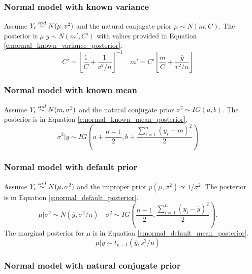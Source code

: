\subsubsection{Normal model with known variance}

Assume $Y_i\stackrel{ind}{\sim} N(\mu,v^2)$ and the natural conjugate prior $\mu\sim N(m,C)$. 
The posterior is $\mu|y \sim N(m',C')$ with values provided
in Equation \eqref{e:normal_known_variance_posterior}.
\begin{equation}
C' = \left[\frac{1}{C} + \frac{1}{v^2/n}\right]^{-1} \quad 
m' =  C'\left[\frac{m}{C} + \frac{\overline{y}}{v^2/n}\right]
\label{e:normal_known_variance_posterior}
\end{equation}

\subsubsection{Normal model with known mean}

Assume $Y_i\stackrel{ind}{\sim} N(m,\sigma^2)$ and the natural conjugate prior 
$\sigma^2\sim IG(a,b)$. 
The posterior is in Equation \eqref{e:normal_known_mean_posterior}.
\begin{equation}
\sigma^2|y \sim IG\left( a + \frac{n-1}{2}, b + \frac{\sum_{i=1}^n (y_i-m)^2}{2} \right)
\label{e:normal_known_mean_posterior}
\end{equation}


\subsubsection{Normal model with default prior}

Assume $Y_i\stackrel{ind}{\sim} N(\mu,\sigma^2)$ and the improper prior 
$p(\mu,\sigma^2) \propto 1/\sigma^2$. 
The posterior is in Equation \eqref{e:normal_default_posterior}.
\begin{equation}
\mu|\sigma^2 \sim N(\overline{y},\sigma^2/n) \quad 
\sigma^2 \sim IG\left(\frac{n-1}{2},\frac{\sum_{i=1}^n (y_i-\overline{y})^2}{2}\right).
\label{e:normal_default_posterior}
\end{equation}
The marginal posterior for $\mu$ is in Equation 
\eqref{e:normal_default_mean_posterior}.
\begin{equation}
\mu|y \sim t_{n-1}(\overline{y},s^2/n)
\label{e:normal_default_mean_posterior}
\end{equation}


\subsubsection{Normal model with natural conjugate prior}

